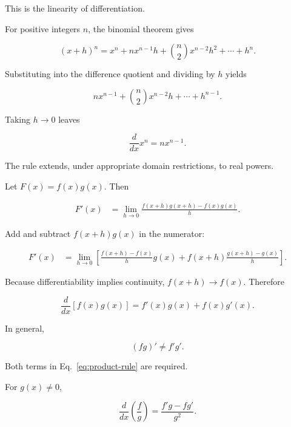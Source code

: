 This is the linearity of differentiation.


For positive integers $n$, the binomial theorem gives

\[
(x+h)^n=x^n+nx^{n-1}h+\binom n2x^{n-2}h^2+\cdots+h^n.
\]

Substituting into the difference quotient and dividing by $h$ yields

\[
nx^{n-1}+\binom n2x^{n-2}h+\cdots+h^{n-1}.
\]

Taking $h\to0$ leaves

\begin{equation}
\boxed{
\frac{d}{dx}x^n=nx^{n-1}.
}
\label{eq:power-rule}
\end{equation}

The rule extends, under appropriate domain restrictions, to real powers.


Let $F(x)=f(x)g(x)$. Then

\begin{align*}
F'(x)
&=
\lim_{h\to0}
\frac{f(x+h)g(x+h)-f(x)g(x)}{h}.
\end{align*}

Add and subtract $f(x+h)g(x)$ in the numerator:

\begin{align*}
F'(x)
&=
\lim_{h\to0}
\left[
\frac{f(x+h)-f(x)}{h}g(x)
+f(x+h)\frac{g(x+h)-g(x)}{h}
\right].
\end{align*}

Because differentiability implies continuity, $f(x+h)\to f(x)$. Therefore

\begin{equation}
\boxed{
\frac{d}{dx}[f(x)g(x)]
=f'(x)g(x)+f(x)g'(x).
}
\label{eq:product-rule}
\end{equation}

\begin{bookwarning}
In general,

\[
(fg)'\neq f'g'.
\]

Both terms in Eq.~\eqref{eq:product-rule} are required.
\end{bookwarning}


For $g(x)\neq0$,

\begin{equation}
\boxed{
\frac{d}{dx}\left(\frac{f}{g}\right)
=
\frac{f'g-fg'}{g^2}.
}
\label{eq:quotient-rule}
\end{equation}

